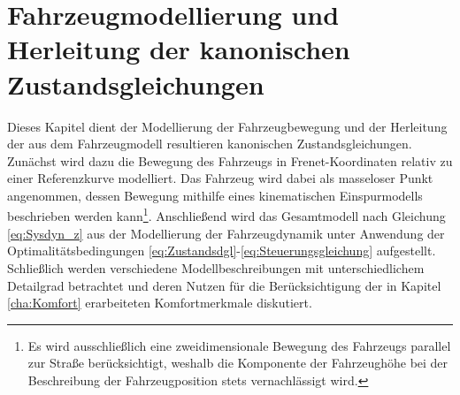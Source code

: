 \chapter{Fahrzeugmodellierung und Herleitung der kanonischen Zustandsgleichungen}\label{cha:Modellbildung}
Dieses Kapitel dient der Modellierung der Fahrzeugbewegung und der Herleitung der aus dem Fahrzeugmodell resultieren kanonischen Zustandsgleichungen. Zunächst wird dazu die Bewegung des Fahrzeugs in Frenet-Koordinaten relativ zu einer Referenzkurve modelliert. Das Fahrzeug wird dabei als masseloser Punkt angenommen, dessen Bewegung mithilfe eines kinematischen Einspurmodells beschrieben werden kann\footnote{Es wird ausschließlich eine zweidimensionale Bewegung des Fahrzeugs parallel zur Straße berücksichtigt, weshalb die Komponente der Fahrzeughöhe bei der Beschreibung der Fahrzeugposition stets vernachlässigt wird.}. Anschließend wird das Gesamtmodell nach Gleichung \eqref{eq:Sysdyn_z} aus der Modellierung der Fahrzeugdynamik unter Anwendung der Optimalitätsbedingungen \eqref{eq:Zustandsdgl}-\eqref{eq:Steuerungsgleichung} aufgestellt. Schließlich werden verschiedene Modellbeschreibungen mit unterschiedlichem Detailgrad betrachtet und deren Nutzen für die Berücksichtigung der in Kapitel \ref{cha:Komfort} erarbeiteten Komfortmerkmale diskutiert. 
